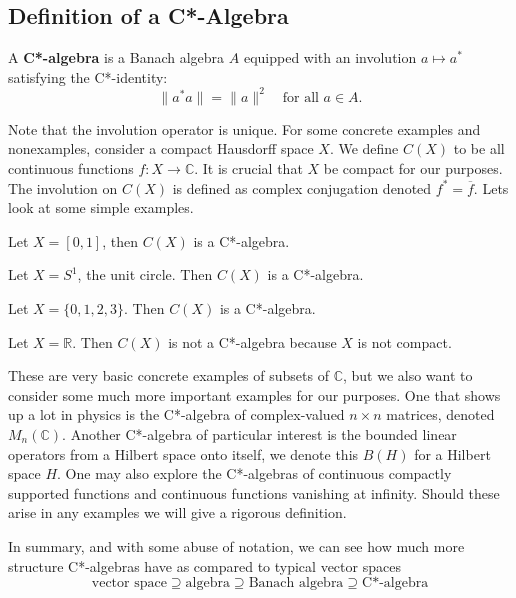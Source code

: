 \subsection{Definition of a C*-Algebra}
\begin{definition}
A \textbf{C*-algebra} is a Banach algebra \( A \) equipped with an involution \( a \mapsto a^* \) satisfying the C*-identity:
\[
\|a^*a\| = \|a\|^2 \quad \text{for all } a \in A.
\]
\end{definition}
Note that the involution operator is unique. For some concrete examples and nonexamples, consider a compact Hausdorff space $X$.
We define $C(X)$ to be all continuous functions $f: X \to \mathbb{C}$. It is crucial
that $X$ be compact for our purposes. The involution on $C(X)$ is defined as complex
conjugation denoted $f^* = \overline{f}$. Lets look at some simple examples.
\begin{example}
    Let $X = [0,1]$, then $C(X)$ is a C*-algebra.
\end{example}

\begin{example}
    Let $X = S^1$, the unit circle. Then $C(X)$ is a C*-algebra.
\end{example}

\begin{example}
    Let $X = \{ 0, 1, 2, 3\}$. Then $C(X)$ is a C*-algebra.
\end{example}

\begin{example}
    Let $X = \mathbb{R}$. Then $C(X)$ is not a C*-algebra because $X$ is not compact.
\end{example}

These are very basic concrete examples of subsets of $\mathbb{C}$, but we also want
to consider some much more important examples for our purposes. One that shows up a
lot in physics is the C*-algebra of complex-valued $n \times n$ matrices, denoted $M_n(\mathbb{C})$.
Another C*-algebra of particular interest is the bounded linear operators from a Hilbert
space onto itself, we denote this $B(H)$ for a Hilbert space $H$. One may also explore
the C*-algebras of continuous compactly supported functions and continuous functions
vanishing at infinity. Should these arise in any examples we will give a rigorous
definition.

\par

In summary, and with some abuse of notation, we can see how much more structure
C*-algebras have as compared to typical vector spaces
\begin{equation*}
    \text{vector space} \supseteq \text{algebra} \supseteq \text{Banach algebra} \supseteq \text{C*-algebra}
\end{equation*}

